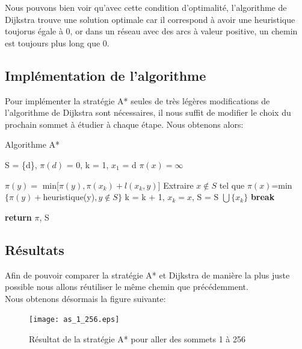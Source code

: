 \documentclass{article}
\begin{document}
Nous pouvons bien voir qu'avec cette condition d'optimalité, l'algorithme de Dijkstra trouve une solution
optimale car il correspond à avoir une heuristique toujorus égale à 0, or dans un réseau avec des arcs
à valeur positive, un chemin est toujours plus long que 0.

\subsection{Implémentation de l'algorithme}

Pour implémenter la stratégie A* seules de très légères modifications de l'algorithme de Dijkstra sont
nécessaires, il nous suffit de modifier le choix du prochain sommet à étudier à chaque étape.
Nous obtenons alors:\\

\clearpage


\begin{algorithm}
\caption{Algorithme A*}\label{astar}
\begin{algorithmic}[1]
	\State S = \{d\}, $\pi(d)$ = 0, k = 1, $x_1$ = d
		\State $\pi(x) = \infty$
	\EndFor
	
			\State $\pi(y) = $ min[$\pi(y), \pi(x_k) + l(x_k, y)$]
		\EndFor
		\State Extraire $x \not\in S$ tel que $\pi(x)$=min$\{\pi(y)+$heuristique(y)$, y \not\in S\}$
		\State k = k + 1, $x_k = x$, S = S $\bigcup \{x_k\}$
			\State \textbf{break}
		\EndIf
	\EndWhile
	
	\State \textbf{return} $\pi$, S
\EndProcedure 
\end{algorithmic}
\end{algorithm}

\subsection{Résultats}

Afin de pouvoir comparer la stratégie A* et Dijkstra de manière la plus juste possible nous allons
réutiliser le même chemin que précédemment.\\

Nous obtenons désormais la figure suivante:\\

\begin{figure}[!hbt]
	\centering
		\texttt{[image: as\_1\_256.eps]}
	\caption{Résultat de la stratégie A* pour aller des sommets 1 à 256}
	\label{as_1}
\end{figure}
\end{document}
